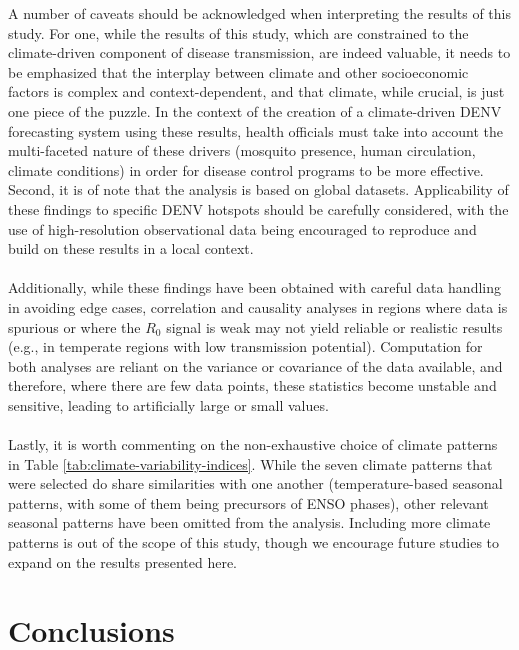 \documentclass[10pt,twocolumn]{wlscirep}
\begin{document}
A number of caveats should be acknowledged when interpreting the results of this study. For one, while the results of this study, which are constrained to the climate-driven component of disease transmission, are indeed valuable, it needs to be emphasized that the interplay between climate and other socioeconomic factors is complex and context-dependent, and that climate, while crucial, is just one piece of the puzzle. In the context of the creation of a climate-driven DENV forecasting system using these results, health officials must take into account the multi-faceted nature of these drivers (mosquito presence, human circulation, climate conditions) in order for disease control programs to be more effective. Second, it is of note that the analysis is based on global datasets. Applicability of these findings to specific DENV hotspots should be carefully considered, with the use of high-resolution observational data being encouraged to reproduce and build on these results in a local context.
\\
\\
Additionally, while these findings have been obtained with careful data handling in avoiding edge cases, correlation and causality analyses in regions where data is spurious or where the $R_0$ signal is weak may not yield reliable or realistic results (e.g., in temperate regions with low transmission potential). Computation for both analyses are reliant on the variance or covariance of the data available, and therefore, where there are few data points, these statistics become unstable and sensitive, leading to artificially large or small values.
\\
\\
Lastly, it is worth commenting on the non-exhaustive choice of climate patterns in Table \ref{tab:climate-variability-indices}. While the seven climate patterns that were selected do share similarities with one another (temperature-based seasonal patterns, with some of them being precursors of ENSO phases), other relevant seasonal patterns have been omitted from the analysis. Including more climate patterns is out of the scope of this study, though we encourage future studies to expand on the results presented here.

\section{Conclusions} \label{sec-conclusions}
\end{document}
